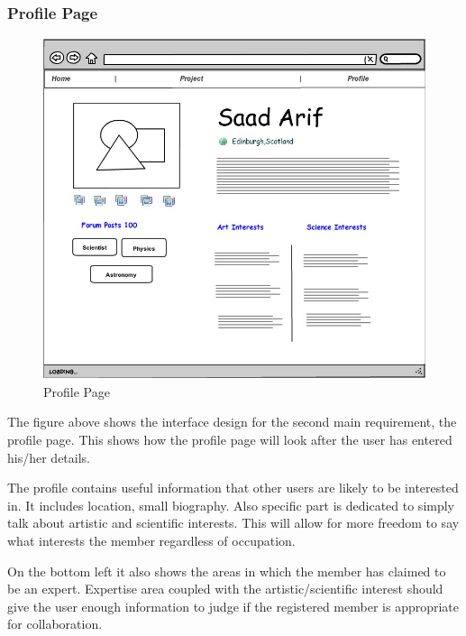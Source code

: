 \documentclass[a4paper,oneside,11pt]{report}
\begin{document}
\pagebreak
\subsubsection{Profile Page}
\begin{figure}[!ht]
\centering
\includegraphics[width=\textwidth,height=10cm]{Profile.jpg}
\caption{Profile Page}
\end{figure}

The figure above shows the interface design for the second main requirement, the profile page. This shows how the profile page will look after the user has entered his/her details.


The profile contains useful information that other users are likely to be interested in. It includes location, small biography. Also specific part is dedicated to simply talk about artistic and scientific interests. This will allow for more freedom to say what interests the member regardless of occupation.

On the bottom left it also shows the areas in which the member has claimed to be an expert. Expertise area coupled with the artistic/scientific interest should give the user enough information to judge if the registered member is appropriate for collaboration.
\pagebreak
\end{document}
